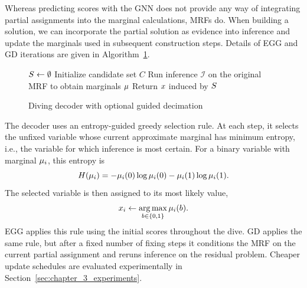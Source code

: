 Whereas predicting scores with the GNN does not provide any way of integrating partial assignments into the marginal calculations, MRFs do. When building a solution, we can incorporate the partial solution as evidence into inference and update the marginals used in subsequent construction steps. Details of EGG and GD iterations are given in Algorithm~\ref{alg:bp_guided_decimation}.

\begin{figure}[htbp]
  \centering
  \begin{minipage}{.7\linewidth}
    \begin{algorithm}[H]
        \LinesNumbered
        \caption{Diving decoder with optional guided decimation}
        \label{alg:bp_guided_decimation}
        $S \gets \emptyset$ 
        Initialize candidate set $C$\;
        Run inference $\mathcal{I}$ on the original MRF to obtain marginals $\mu$\;
        Return $x$ induced by $S$\;
    \end{algorithm}
    \end{minipage}
\end{figure}

The decoder uses an entropy-guided greedy selection rule. At each step, it selects the unfixed variable whose current approximate marginal has minimum entropy, i.e., the variable for which inference is most certain. For a binary variable with marginal $\mu_i$, this entropy is
\begin{equation}
    H(\mu_i)
    =
    - \mu_i(0)\log \mu_i(0)
    - \mu_i(1)\log \mu_i(1).
\end{equation}
The selected variable is then assigned to its most likely value,
\begin{equation}
    x_i \gets \operatorname*{arg\,max}_{b \in \{0,1\}} \mu_i(b).
\end{equation}
EGG applies this rule using the initial scores throughout the dive. GD applies the same rule, but after a fixed number of fixing steps it conditions the MRF on the current partial assignment and reruns inference on the residual problem. Cheaper update schedules are evaluated experimentally in Section~\ref{sec:chapter_3_experiments}.

